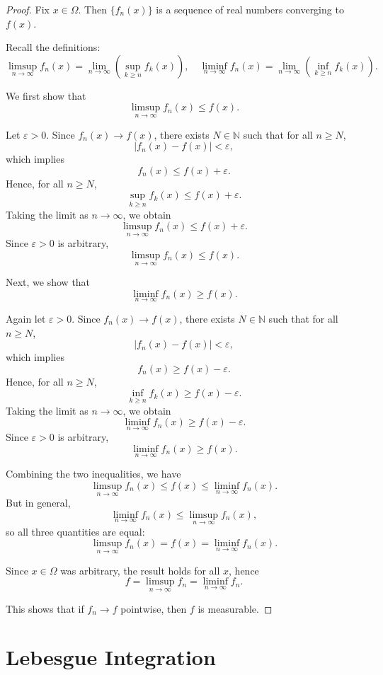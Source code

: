 \begin{proof}
Fix $x \in \Omega$. Then $\{f_n(x)\}$ is a sequence of real numbers converging to $f(x)$.

Recall the definitions:
\[
\limsup_{n\to\infty} f_n(x) = \lim_{n\to\infty} \left( \sup_{k \ge n} f_k(x) \right), 
\quad
\liminf_{n\to\infty} f_n(x) = \lim_{n\to\infty} \left( \inf_{k \ge n} f_k(x) \right).
\]

\medskip

We first show that
\[
\limsup_{n\to\infty} f_n(x) \le f(x).
\]

Let $\varepsilon > 0$. Since $f_n(x) \to f(x)$, there exists $N \in \mathbb{N}$ such that for all $n \ge N$,
\[
|f_n(x) - f(x)| < \varepsilon,
\]
which implies
\[
f_n(x) \le f(x) + \varepsilon.
\]
Hence, for all $n \ge N$,
\[
\sup_{k \ge n} f_k(x) \le f(x) + \varepsilon.
\]
Taking the limit as $n \to \infty$, we obtain
\[
\limsup_{n\to\infty} f_n(x) \le f(x) + \varepsilon.
\]
Since $\varepsilon > 0$ is arbitrary,
\[
\limsup_{n\to\infty} f_n(x) \le f(x).
\]

\medskip

Next, we show that
\[
\liminf_{n\to\infty} f_n(x) \ge f(x).
\]

Again let $\varepsilon > 0$. Since $f_n(x) \to f(x)$, there exists $N \in \mathbb{N}$ such that for all $n \ge N$,
\[
|f_n(x) - f(x)| < \varepsilon,
\]
which implies
\[
f_n(x) \ge f(x) - \varepsilon.
\]
Hence, for all $n \ge N$,
\[
\inf_{k \ge n} f_k(x) \ge f(x) - \varepsilon.
\]
Taking the limit as $n \to \infty$, we obtain
\[
\liminf_{n\to\infty} f_n(x) \ge f(x) - \varepsilon.
\]
Since $\varepsilon > 0$ is arbitrary,
\[
\liminf_{n\to\infty} f_n(x) \ge f(x).
\]

\medskip

Combining the two inequalities, we have
\[
\limsup_{n\to\infty} f_n(x) \le f(x) \le \liminf_{n\to\infty} f_n(x).
\]
But in general,
\[
\liminf_{n\to\infty} f_n(x) \le \limsup_{n\to\infty} f_n(x),
\]
so all three quantities are equal:
\[
\limsup_{n\to\infty} f_n(x) = f(x) = \liminf_{n\to\infty} f_n(x).
\]

Since $x \in \Omega$ was arbitrary, the result holds for all $x$, hence
\[
f = \limsup_{n\to\infty} f_n = \liminf_{n\to\infty} f_n.
\]

This shows that if \(f_n \to f\) pointwise, then \(f\) is measurable.  
\end{proof}

\chapter{Lebesgue Integration}


